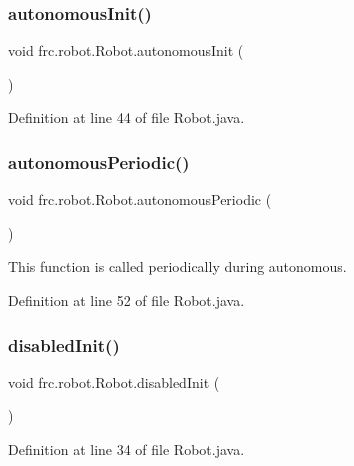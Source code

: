 \subsubsection{\texorpdfstring{autonomous\+Init()}{autonomousInit()}}
{\footnotesize\ttfamily void frc.\+robot.\+Robot.\+autonomous\+Init (\begin{DoxyParamCaption}{ }\end{DoxyParamCaption})}



Definition at line 44 of file Robot.\+java.

\mbox{\label{classfrc_1_1robot_1_1Robot_a7dcfe7d0d65d1051eb095b8eb1aebd72}} 
\subsubsection{\texorpdfstring{autonomous\+Periodic()}{autonomousPeriodic()}}
{\footnotesize\ttfamily void frc.\+robot.\+Robot.\+autonomous\+Periodic (\begin{DoxyParamCaption}{ }\end{DoxyParamCaption})}



This function is called periodically during autonomous. 



Definition at line 52 of file Robot.\+java.

\mbox{\label{classfrc_1_1robot_1_1Robot_ac19810fbf26efd4cd47cbd7568b4ad2a}} 
\subsubsection{\texorpdfstring{disabled\+Init()}{disabledInit()}}
{\footnotesize\ttfamily void frc.\+robot.\+Robot.\+disabled\+Init (\begin{DoxyParamCaption}{ }\end{DoxyParamCaption})}



Definition at line 34 of file Robot.\+java.

